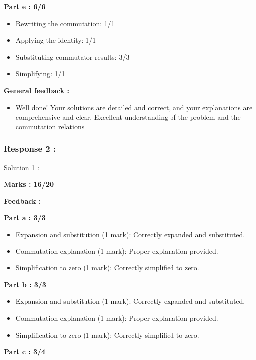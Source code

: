 \documentclass[a4paper,11pt]{article}
\begin{document}
\textbf{Part e : 6/6}

\begin{itemize}
    \item Rewriting the commutation: 1/1
    \item Applying the identity: 1/1
    \item Substituting commutator results: 3/3
    \item Simplifying: 1/1
\end{itemize}


\textbf{General feedback :}

\begin{itemize}
    \item Well done! Your solutions are detailed and correct, and your explanations are comprehensive and clear. Excellent understanding of the problem and the commutation relations.
\end{itemize}



\subsubsection*{Response 2 :}

Solution 1 :

\textbf{Marks : 16/20}

\textbf{Feedback :}

\textbf{Part a : 3/3}

\begin{itemize}
    \item Expansion and substitution (1 mark): Correctly expanded and substituted.
    \item Commutation explanation (1 mark): Proper explanation provided.
    \item Simplification to zero (1 mark): Correctly simplified to zero.
\end{itemize}


\textbf{Part b : 3/3}

\begin{itemize}
    \item Expansion and substitution (1 mark): Correctly expanded and substituted.
    \item Commutation explanation (1 mark): Proper explanation provided.
    \item Simplification to zero (1 mark): Correctly simplified to zero.
\end{itemize}


\textbf{Part c : 3/4}
\end{document}
